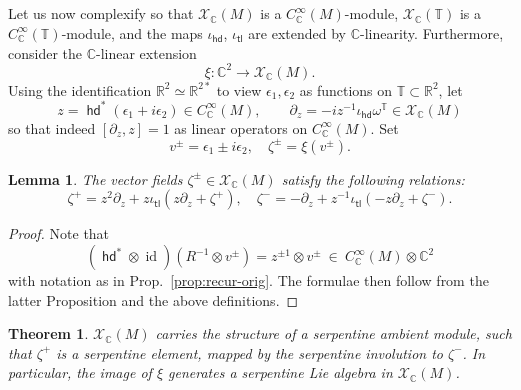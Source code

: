 \documentclass{amsart}
\def\RR{\mathbb{R}}
\def\CC{\mathbb{C}}
\def\TT{\mathbb{T}}
\def\XX{\mathscr{X}}
\DeclareMathOperator{\id}{\mathrm{id}}
\DeclareMathOperator{\tail}{{\mathsf{tl}}}
\DeclareMathOperator{\head}{{\mathsf{hd}}}
\newtheorem{lem}{Lemma}
\newtheorem{thm}{Theorem}
\theoremstyle{definition}
\begin{document}
\subsection{}
Let us now complexify so that $\XX_\CC(M)$ is a $C^\infty_\CC(M)$-module, 
$\XX_\CC(\TT)$ is a $C^\infty_\CC(\TT)$-module, and the maps $\iota_\head$, $\iota_\tail$
are extended by $\CC$-linearity. Furthermore, consider the $\CC$-linear extension
$$ \xi : \CC^2 \to \XX_\CC(M). $$
Using the identification $\RR^2\simeq\RR^{2*}$ to view $\epsilon_1,\epsilon_2$ as functions on $\TT \subset \RR^2$,
let
$$ z = \head^* (\epsilon_1 + i\epsilon_2) \in C^\infty_\CC(M),\qquad
\partial_z = -iz^{-1} \iota_{\head} \omega^\TT \in \XX_\CC(M)$$
so that indeed $[\partial_z,z]=1$ as linear operators on $C^\infty_\CC(M)$.
Set $$ v^\pm = \epsilon_1 \pm i \epsilon_2,\quad \zeta^\pm = \xi(v^\pm). $$
\begin{lem}\label{lem:recur-z}
        The vector fields $\zeta^\pm \in \XX_\CC(M)$ satisfy the following relations:
        $$ \zeta^+ = z^2\partial_z + z \iota_{\tail} (z\partial_z + \zeta^+),\quad
        \zeta^- =   -\partial_z + z^{-1} \iota_{\tail} (-z\partial_z + \zeta^-).
        $$
\end{lem}
\begin{proof}
        Note that $$(\head^*\otimes\id)(R^{-1}\otimes v^\pm) = z^{\pm1}\otimes v^\pm\ \in\ 
        C^\infty_\CC(M) \otimes \CC^2$$
        with notation as in Prop.~\ref{prop:recur-orig}. The formulae then follow from the
        latter Proposition and the above definitions.
\end{proof}

\begin{thm}
        $\XX_\CC(M)$ carries the structure of a serpentine ambient module,
        such that $\zeta^+$ is a serpentine element, mapped by the serpentine involution to $\zeta^-$.
        In particular, the image of $\xi$ generates a serpentine Lie algebra in $\XX_\CC(M)$.
\end{thm}
\end{document}
